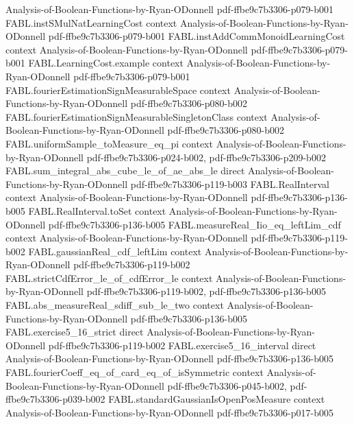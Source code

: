 \begin{theorem}
  {Analysis-of-Boolean-Functions-by-Ryan-ODonnell}
  {pdf-ffbe9c7b3306-p079-b001}
\proofstep
  {FABL.instSMulNatLearningCost}
  {context}
  {Analysis-of-Boolean-Functions-by-Ryan-ODonnell}
  {pdf-ffbe9c7b3306-p079-b001}
\proofstep
  {FABL.instAddCommMonoidLearningCost}
  {context}
  {Analysis-of-Boolean-Functions-by-Ryan-ODonnell}
  {pdf-ffbe9c7b3306-p079-b001}
\proofstep
  {FABL.LearningCost.example}
  {context}
  {Analysis-of-Boolean-Functions-by-Ryan-ODonnell}
  {pdf-ffbe9c7b3306-p079-b001}
\proofstep
  {FABL.fourierEstimationSignMeasurableSpace}
  {context}
  {Analysis-of-Boolean-Functions-by-Ryan-ODonnell}
  {pdf-ffbe9c7b3306-p080-b002}
\proofstep
  {FABL.fourierEstimationSignMeasurableSingletonClass}
  {context}
  {Analysis-of-Boolean-Functions-by-Ryan-ODonnell}
  {pdf-ffbe9c7b3306-p080-b002}
\proofstep
  {FABL.uniformSample_toMeasure_eq_pi}
  {context}
  {Analysis-of-Boolean-Functions-by-Ryan-ODonnell}
  {pdf-ffbe9c7b3306-p024-b002,
    pdf-ffbe9c7b3306-p209-b002}
\proofstep
  {FABL.sum_integral_abs_cube_le_of_ae_abs_le}
  {direct}
  {Analysis-of-Boolean-Functions-by-Ryan-ODonnell}
  {pdf-ffbe9c7b3306-p119-b003}
\proofstep
  {FABL.RealInterval}
  {context}
  {Analysis-of-Boolean-Functions-by-Ryan-ODonnell}
  {pdf-ffbe9c7b3306-p136-b005}
\proofstep
  {FABL.RealInterval.toSet}
  {context}
  {Analysis-of-Boolean-Functions-by-Ryan-ODonnell}
  {pdf-ffbe9c7b3306-p136-b005}
\proofstep
  {FABL.measureReal_Iio_eq_leftLim_cdf}
  {context}
  {Analysis-of-Boolean-Functions-by-Ryan-ODonnell}
  {pdf-ffbe9c7b3306-p119-b002}
\proofstep
  {FABL.gaussianReal_cdf_leftLim}
  {context}
  {Analysis-of-Boolean-Functions-by-Ryan-ODonnell}
  {pdf-ffbe9c7b3306-p119-b002}
\proofstep
  {FABL.strictCdfError_le_of_cdfError_le}
  {context}
  {Analysis-of-Boolean-Functions-by-Ryan-ODonnell}
  {pdf-ffbe9c7b3306-p119-b002,
    pdf-ffbe9c7b3306-p136-b005}
\proofstep
  {FABL.abs_measureReal_sdiff_sub_le_two}
  {context}
  {Analysis-of-Boolean-Functions-by-Ryan-ODonnell}
  {pdf-ffbe9c7b3306-p136-b005}
\proofstep
  {FABL.exercise5_16_strict}
  {direct}
  {Analysis-of-Boolean-Functions-by-Ryan-ODonnell}
  {pdf-ffbe9c7b3306-p119-b002}
\proofstep
  {FABL.exercise5_16_interval}
  {direct}
  {Analysis-of-Boolean-Functions-by-Ryan-ODonnell}
  {pdf-ffbe9c7b3306-p136-b005}
\proofstep
  {FABL.fourierCoeff_eq_of_card_eq_of_isSymmetric}
  {context}
  {Analysis-of-Boolean-Functions-by-Ryan-ODonnell}
  {pdf-ffbe9c7b3306-p045-b002,
    pdf-ffbe9c7b3306-p039-b002}
\proofstep
  {FABL.standardGaussianIsOpenPosMeasure}
  {context}
  {Analysis-of-Boolean-Functions-by-Ryan-ODonnell}
  {pdf-ffbe9c7b3306-p017-b005}

\end{theorem}
